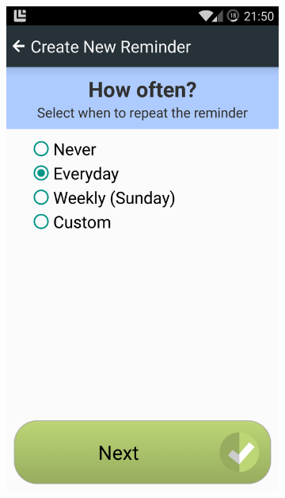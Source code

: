 \begin{figure}[h]
\begin{subfigure}[t]{0.3\textwidth}
        \includegraphics[width=\textwidth]{Files/treatment-study-1/figures/app-remindercreate-type}
        \caption{}
        \label{fig: remindercreate-repeat}
    \end{subfigure}
    \hfill
	\begin{subfigure}[t]{0.3\textwidth}
        \centering

\end{subfigure}
\end{figure}
